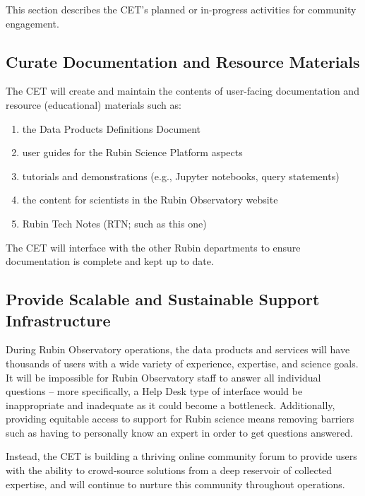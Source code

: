 \documentclass[DM,lsstdraft,toc]{lsstdoc}
\begin{document}
This section describes the CET's planned or in-progress activities for community engagement. 


\subsection{Curate Documentation and Resource Materials}\label{ssec:mod_docs}

The CET will create and maintain the contents of user-facing documentation and resource (educational) materials such as:
\begin{enumerate}
\item the Data Products Definitions Document 
\item user guides for the Rubin Science Platform aspects
\item tutorials and demonstrations (e.g., Jupyter notebooks, query statements)
\item the content for scientists in the Rubin Observatory website
\item Rubin Tech Notes (RTN; such as this one)
\end{enumerate}

The CET will interface with the other Rubin departments to ensure documentation is complete and kept up to date.


\subsection{Provide Scalable and Sustainable Support Infrastructure}\label{ssec:mod_support}

During Rubin Observatory operations, the data products and services will have thousands of users with a wide variety of experience, expertise, and science goals.
It will be impossible for Rubin Observatory staff to answer all individual questions -- more specifically, a Help Desk type of interface would be inappropriate and inadequate as it could become a bottleneck.
Additionally, providing equitable access to support for Rubin science means removing barriers such as having to personally know an expert in order to get questions answered.

Instead, the CET is building a thriving online community forum to provide users with the ability to crowd-source solutions from a deep reservoir of collected expertise, and will continue to nurture this community throughout operations.
\end{document}
